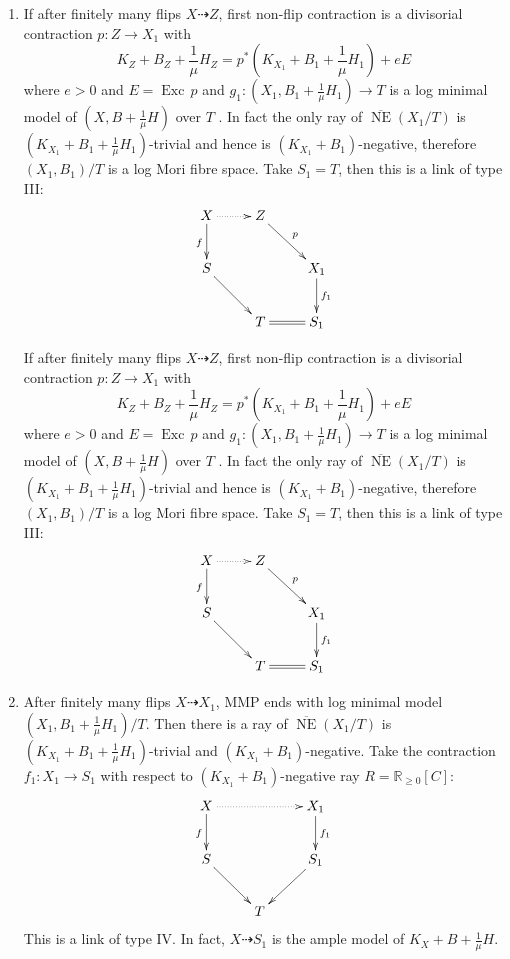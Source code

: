 \documentclass{article}
\begin{document}
\begin{enumerate}[(A)]
\begin{enumerate}[1)]
    \item \label{a3}
      \begin{multicols}{2}
      If after finitely many flips $ X\dashrightarrow Z $, first non-flip contraction is a divisorial contraction $ p:Z\to X_1$ with 
    \[ K_Z+B_Z+\frac{1}{\mu}H_Z=p^*(K_{X_1}+B_1+\frac{1}{\mu}H_1)+eE \]
    where $ e>0 $ and  $E=\operatorname{Exc}\,p$ and  $g_{1}: (X_1,B_1+\frac{1}{\mu}H_1) \to T$ is a log minimal model of $(X,B+\frac{1}{\mu}H)$ over $T$ . In fact the only ray of $ \overline{\operatorname{NE}}(X_1/T) $ is $ (K_{X_1}+B_1+\frac{1}{\mu}H_1) $-trivial and hence is $ (K_{X_1}+B_1) $-negative, therefore $ (X_1,B_1)/T $ is a log Mori fibre space. Take $ S_1=T $, then this is a link of type III:
    \[ \xymatrix{
      X\ar[d]_f\ar@{.>}[r]&Z\ar[rd]^{p}&\\
      S\ar[dr]&&X_1\ar[d]^{f_1}\\
      &T&S_1\ar@{=}[l]}\]
\end{multicols}
      If after finitely many flips $ X\dashrightarrow Z $, first non-flip contraction is a divisorial contraction $ p:Z\to X_1$ with 
    \[ K_Z+B_Z+\frac{1}{\mu}H_Z=p^*(K_{X_1}+B_1+\frac{1}{\mu}H_1)+eE \]
    where $ e>0 $ and  $E=\operatorname{Exc}\,p$ and  $g_{1}: (X_1,B_1+\frac{1}{\mu}H_1) \to T$ is a log minimal model of $(X,B+\frac{1}{\mu}H)$ over $T$ . In fact the only ray of $ \overline{\operatorname{NE}}(X_1/T) $ is $ (K_{X_1}+B_1+\frac{1}{\mu}H_1) $-trivial and hence is $ (K_{X_1}+B_1) $-negative, therefore $ (X_1,B_1)/T $ is a log Mori fibre space. Take $ S_1=T $, then this is a link of type III:
    \[ \xymatrix{
      X\ar[d]_f\ar@{.>}[r]&Z\ar[rd]^{p}&\\
      S\ar[dr]&&X_1\ar[d]^{f_1}\\
      &T&S_1\ar@{=}[l]}\]
  \item \label{a4}After finitely many flips $ X\dashrightarrow X_1 $, MMP ends with log minimal model $ (X_1,B_1+\frac{1}{\mu}H_1)/T $. Then there is a ray of $ \overline{\operatorname{NE}}(X_1/T) $ is $ (K_{X_1}+B_1+\frac{1}{\mu}H_1) $-trivial and $ (K_{X_1}+B_1) $-negative.  Take the contraction $ f_1:X_1\to S_1 $ with respect to $ (K_{X_1}+B_1) $-negative ray $ R=\mathbb{R}_{\geqslant 0}[C] $: 
    \[ \xymatrix{
      X\ar[d]_f\ar@{.>}[rr]&&X_1\ar[d]^{f_1}\\
      S\ar[dr]&&S_1\ar[dl]\\
      &T &}\]
    This is a link of type IV. In fact, $X \dashrightarrow  S_{1}$ is the ample model of $K_{X}+B+\frac{1}{\mu}H$.
  \end{enumerate}


\end{enumerate}
\end{document}
